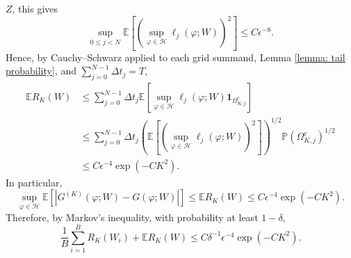 \documentclass[twoside,11pt]{article}
\newcommand{\E}{\mathbb{E}}
\newcommand{\1}{\mathbf{1}}
\numberwithin{equation}{section}
\begin{document}
$Z$, this gives
\begin{equation}\label{eq: weak local loss second moment}
    \sup_{0\le j<N}
    \E\!\left[
    \left(\sup_{\varphi\in\mathcal H}\ell_j(\varphi;W)\right)^2
    \right]
    \le
    C\epsilon^{-8}.
\end{equation}
Hence, by Cauchy--Schwarz applied to each
grid summand, Lemma \ref{lemma: tail probability}, and
$\sum_{j=0}^{N-1}\Delta t_j=T$,
\begin{equation}\label{eq: term 3 bound}
\begin{aligned}
    \E R_K(W)
    &\le
    \sum_{j=0}^{N-1}\Delta t_j
    \E\left[
    \sup_{\varphi\in\mathcal H}\ell_j(\varphi;W)
    \1_{\Omega_{K,j}^c}\right]                                  \\
    &\le
    \sum_{j=0}^{N-1}\Delta t_j
    \left(
    \E\!\left[
    \left(\sup_{\varphi\in\mathcal H}\ell_j(\varphi;W)\right)^2
    \right]
    \right)^{1/2}
    \mathbb P(\Omega_{K,j}^c)^{1/2}                                  \\
    &\le
    C\epsilon^{-4}\exp(-CK^2).
\end{aligned}
\end{equation}
In particular,
\[
    \sup_{\varphi\in\mathcal H}
    \E\left[
    |G^{(K)}(\varphi;W)-G(\varphi;W)|
    \right]
    \le
    \E R_K(W)
    \le
    C\epsilon^{-4}\exp(-CK^2).
\]
Therefore, by Markov's inequality, with probability at least $1-\delta$,
\begin{equation}\label{eq: clipping remainder bound}
    \frac1B\sum_{i=1}^B R_K(W_i)+\E R_K(W)
    \le
    C\delta^{-1}\epsilon^{-4}\exp(-CK^2).
\end{equation}
\end{document}
